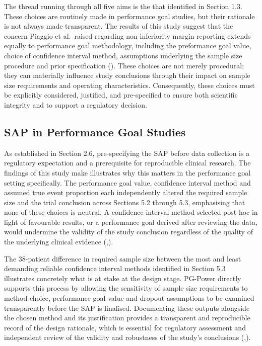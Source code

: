 \documentclass{article}
\begin{document}
The thread running through all five aims is the that identified in
Section 1.3. These choices are routinely made in performance goal
studies, but their rationale is not always made transparent. The results
of this study suggest that the concern Piaggio et al.~raised regarding
non-inferiority margin reporting extends equally to performance goal
methodology, including the preformance goal value, choice of confidence
interval method, assumptions underlying the sample size procedure and
prior specification (). These
choices are not merely procedural; they can materially influence study
conclusions through their impact on sample size requirements and
operating characteristics. Consequently, these choices must be
explicitly considered, justified, and pre-specified to ensure both
scientific integrity and to support a regulatory decision.

\subsection{SAP in Performance Goal
Studies}\label{sap-in-performance-goal-studies}

As established in Section 2.6, pre-specifying the SAP before data
collection is a regulatory expectation and a prerequisite for
reproducible clinical research. The findings of this study make
illustrates why this matters in the performance goal setting
specifically. The performance goal value, confidence interval method and
assumed true event proportion each independently altered the required
sample size and the trial conclusion across Sections 5.2 through 5.3,
emphasising that none of these choices is neutral. A confidence interval
method selected post-hoc in light of favourable results, or a
performance goal derived after reviewing the data, would undermine the
validity of the study conclusion regardless of the quality of the
underlying clinical evidence
(,).

The 38-patient difference in required sample size between the most and
least demanding reliable confidence interval methods identified in
Section 5.3 illustrates concretely what is at stake at the design stage.
PG-Power directly supports this process by allowing the sensitivity of
sample size requirements to method choice, performance goal value and
dropout assumptions to be examined transparently before the SAP is
finalised. Documenting these outputs alongside the chosen method and its
justification provides a transparent and reproducible record of the
design rationale, which is essential for regulatory assessment and
independent review of the validity and robustness of the study's
conclusions
(,).
\end{document}
